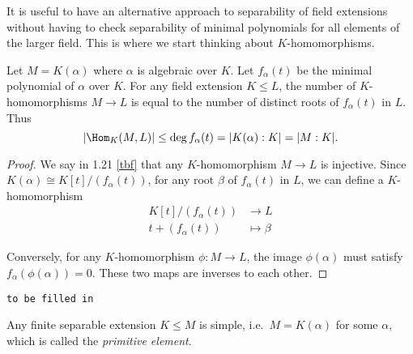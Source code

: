 \documentclass[a4paper]{article}
\begin{document}
\begin{remark}
  It is useful to have an alternative approach to separability of field extensions without having to check separability of minimal polynomials for all elements of the larger field. This is where we start thinking about \(K\)-homomorphisms.
\end{remark}

\begin{lemma}
  Let \(M = K(\alpha)\) where \(\alpha\) is algebraic over \(K\). Let \(f_\alpha(t)\) be the minimal polynomial of \(\alpha\) over \(K\). For any field extension \(K \leq L\), the number of \(K\)-homomorphisms \(M \to L\) is equal to the number of distinct roots of \(f_\alpha(t)\) in \(L\). Thus
  \[
    |\Hom_K(M, L)| \leq \deg f_\alpha(t) = |K(\alpha):K| = |M:K|.
  \]
\end{lemma}

\begin{proof}
  We say in 1.21 \ref{tbf} that any \(K\)-homomorphism \(M \to L\) is injective. Since \(K(\alpha) \cong K[t]/(f_\alpha(t))\), for any root \(\beta\) of \(f_\alpha(t)\) in \(L\), we can define a \(K\)-homomorphism
  \begin{align*}
    K[t]/(f_\alpha(t)) &\to L \\
    t + (f_\alpha(t)) &\mapsto \beta
  \end{align*}

  Conversely, for any \(K\)-homomorphism \(\phi: M \to L\), the image \(\phi(\alpha)\) must satisfy \(f_\alpha(\phi(\alpha)) = 0\). These two maps are inverses to each other.
\end{proof}

\texttt{to be filled in}

\blindtext
%
%
%
%
%

\begin{theorem}
  \label{thm:primitive}
  Any finite separable extension \(K \leq M\) is simple, i.e.\ \(M = K(\alpha)\) for some \(\alpha\), which is called the \emph{primitive element}.
\end{theorem}
\end{document}
